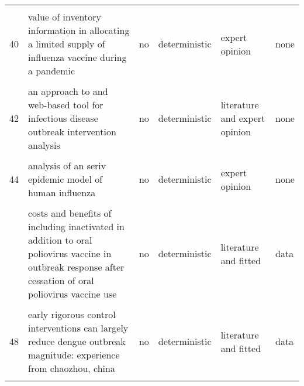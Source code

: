 \documentclass[
]{article}
\begin{document}
\begin{landscape}
\begin{longtable}{l>{\raggedright\arraybackslash}p{3cm}l>{\raggedright\arraybackslash}p{3cm}ll}
\cellcolor{gray!6}{39} & \cellcolor{gray!6}{the potential impact of case-area targeted interventions in response to cholera outbreaks: a modeling study} & \cellcolor{gray!6}{yes} & \cellcolor{gray!6}{stochastic} & \cellcolor{gray!6}{literature and fitted} & \cellcolor{gray!6}{data}\\
40 & value of inventory information in allocating a limited supply of influenza vaccine during a pandemic & no & deterministic & expert opinion & none\\
\addlinespace
\cellcolor{gray!6}{41} & \cellcolor{gray!6}{an age-structured model for cholera control with vaccination} & \cellcolor{gray!6}{no} & \cellcolor{gray!6}{deterministic} & \cellcolor{gray!6}{literature and expert opinion} & \cellcolor{gray!6}{none}\\
42 & an approach to and web-based tool for infectious disease outbreak intervention analysis & no & deterministic & literature and expert opinion & none\\
\cellcolor{gray!6}{43} & \cellcolor{gray!6}{an economic assessment of foot and mouth disease in japan} & \cellcolor{gray!6}{no} & \cellcolor{gray!6}{deterministic} & \cellcolor{gray!6}{literature} & \cellcolor{gray!6}{none}\\
44 & analysis of an seriv epidemic model of human influenza & no & deterministic & expert opinion & none\\
\cellcolor{gray!6}{45} & \cellcolor{gray!6}{control strategies of avian influenza pandemic model with time delay} & \cellcolor{gray!6}{no} & \cellcolor{gray!6}{deterministic} & \cellcolor{gray!6}{expert opinion} & \cellcolor{gray!6}{none}\\
\addlinespace
46 & costs and benefits of including inactivated in addition to oral poliovirus vaccine in outbreak response after cessation of oral poliovirus vaccine use & no & deterministic & literature and fitted & data\\
\cellcolor{gray!6}{47} & \cellcolor{gray!6}{deriving effective vaccine allocation strategies for pandemic influenza: comparison of an agent-based simulation and a compartmental model} & \cellcolor{gray!6}{yes} & \cellcolor{gray!6}{both} & \cellcolor{gray!6}{literature and expert opinion and fitted} & \cellcolor{gray!6}{another model}\\
48 & early rigorous control interventions can largely reduce dengue outbreak magnitude: experience from chaozhou, china & no & deterministic & literature and fitted & data\\
\cellcolor{gray!6}{49} & \cellcolor{gray!6}{effects of reactive social distancing on the 1918 influenza pandemic} & \cellcolor{gray!6}{yes} & \cellcolor{gray!6}{stochastic} & \cellcolor{gray!6}{literature and fitted} & \cellcolor{gray!6}{data}\\

\end{longtable}
\end{landscape}
\end{document}
